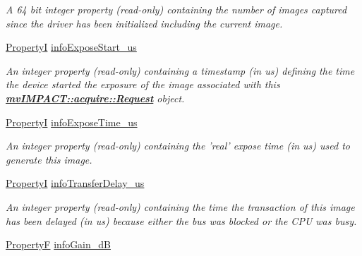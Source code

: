 \begin{DoxyCompactItemize}
\begin{DoxyCompactList}\small\item\em A 64 bit integer property {\bfseries }(read-\/only) containing the number of images captured since the driver has been initialized including the current image. \end{DoxyCompactList}\item 
\hyperlink{group___common_interface_ga12d5e434238ca242a1ba4c6c3ea45780}{Property\+I} \hyperlink{classmv_i_m_p_a_c_t_1_1acquire_1_1_request_ac54da8206db5d5175d1c4c25baf0b134}{info\+Expose\+Start\+\_\+us}
\begin{DoxyCompactList}\small\item\em An integer property {\bfseries }(read-\/only) containing a timestamp (in us) defining the time the device started the exposure of the image associated with this {\bfseries \hyperlink{classmv_i_m_p_a_c_t_1_1acquire_1_1_request}{mv\+I\+M\+P\+A\+C\+T\+::acquire\+::\+Request}} object. \end{DoxyCompactList}\item 
\hyperlink{group___common_interface_ga12d5e434238ca242a1ba4c6c3ea45780}{Property\+I} \hyperlink{classmv_i_m_p_a_c_t_1_1acquire_1_1_request_a872084ae4d05e6276afb06a314d8af59}{info\+Expose\+Time\+\_\+us}
\begin{DoxyCompactList}\small\item\em An integer property {\bfseries }(read-\/only) containing the 'real' expose time (in us) used to generate this image. \end{DoxyCompactList}\item 
\hyperlink{group___common_interface_ga12d5e434238ca242a1ba4c6c3ea45780}{Property\+I} \hyperlink{classmv_i_m_p_a_c_t_1_1acquire_1_1_request_a6e57b8102fcc2bed76459ed24c09f6cf}{info\+Transfer\+Delay\+\_\+us}
\begin{DoxyCompactList}\small\item\em An integer property {\bfseries }(read-\/only) containing the time the transaction of this image has been delayed (in us) because either the bus was blocked or the C\+P\+U was busy. \end{DoxyCompactList}\item 
\hypertarget{classmv_i_m_p_a_c_t_1_1acquire_1_1_request_a8d6be44d8421373b538b60ca56633385}{\hyperlink{group___common_interface_gaf54865fe5a3d5cfd15f9a111b40d09f9}{Property\+F} \hyperlink{classmv_i_m_p_a_c_t_1_1acquire_1_1_request_a8d6be44d8421373b538b60ca56633385}{info\+Gain\+\_\+d\+B}}\label{classmv_i_m_p_a_c_t_1_1acquire_1_1_request_a8d6be44d8421373b538b60ca56633385}


\end{DoxyCompactItemize}
